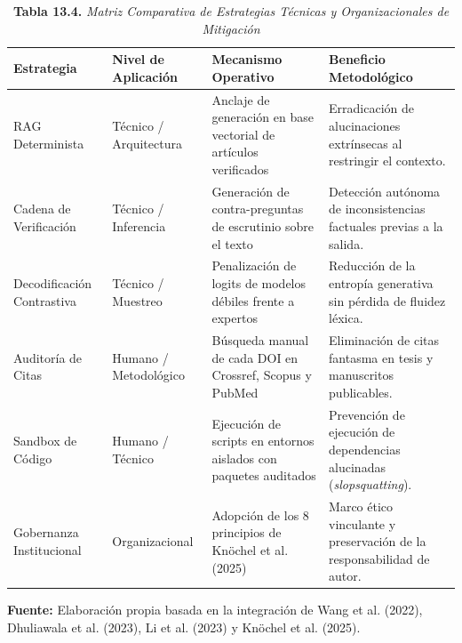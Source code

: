 \begin{table}[htpb!]
\centering
\small
\renewcommand{\arraystretch}{1.4}
\begin{tcolorbox}[colback=white, colframe=unmsm_gold, arc=3pt, boxrule=0.8pt, top=0.2cm, bottom=0.2cm, left=0.3cm, right=0.3cm]
\caption*{\textbf{Tabla 13.4.} \textit{Matriz Comparativa de Estrategias Técnicas y Organizacionales de Mitigación}}
\begin{tabularx}{\textwidth}{l p{3.2cm} p{4.2cm} X}
\toprule
\textbf{Estrategia} & \textbf{Nivel de Aplicación} & \textbf{Mecanismo Operativo} & \textbf{Beneficio Metodológico} \\
\midrule
RAG Determinista & Técnico / Arquitectura & Anclaje de generación en base vectorial de artículos verificados & Erradicación de alucinaciones extrínsecas al restringir el contexto. \\
Cadena de Verificación & Técnico / Inferencia & Generación de contra-preguntas de escrutinio sobre el texto & Detección autónoma de inconsistencias factuales previas a la salida. \\
Decodificación Contrastiva & Técnico / Muestreo & Penalización de logits de modelos débiles frente a expertos & Reducción de la entropía generativa sin pérdida de fluidez léxica. \\
Auditoría de Citas & Humano / Metodológico & Búsqueda manual de cada DOI en Crossref, Scopus y PubMed & Eliminación de citas fantasma en tesis y manuscritos publicables. \\
Sandbox de Código & Humano / Técnico & Ejecución de scripts en entornos aislados con paquetes auditados & Prevención de ejecución de dependencias alucinadas (\textit{slopsquatting}). \\
Gobernanza Institucional & Organizacional & Adopción de los 8 principios de Knöchel et al. (2025) & Marco ético vinculante y preservación de la responsabilidad de autor. \\
\bottomrule
\end{tabularx}
\vspace{0.15cm}
\raggedright
\scriptsize \textbf{Fuente:} Elaboración propia basada en la integración de Wang et al. (2022), Dhuliawala et al. (2023), Li et al. (2023) y Knöchel et al. (2025).
\end{tcolorbox}
\vspace{-0.2cm}
\end{table}

\newpage
{}
\vspace*{0.8cm}
\\[0.8cm]

